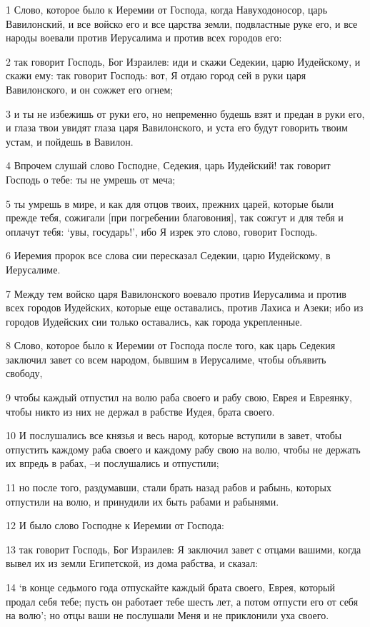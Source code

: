 \par 1 Слово, которое было к Иеремии от Господа, когда Навуходоносор, царь Вавилонский, и все войско его и все царства земли, подвластные руке его, и все народы воевали против Иерусалима и против всех городов его:
\par 2 так говорит Господь, Бог Израилев: иди и скажи Седекии, царю Иудейскому, и скажи ему: так говорит Господь: вот, Я отдаю город сей в руки царя Вавилонского, и он сожжет его огнем;
\par 3 и ты не избежишь от руки его, но непременно будешь взят и предан в руки его, и глаза твои увидят глаза царя Вавилонского, и уста его будут говорить твоим устам, и пойдешь в Вавилон.
\par 4 Впрочем слушай слово Господне, Седекия, царь Иудейский! так говорит Господь о тебе: ты не умрешь от меча;
\par 5 ты умрешь в мире, и как для отцов твоих, прежних царей, которые были прежде тебя, сожигали [при погребении благовония], так сожгут и для тебя и оплачут тебя: `увы, государь!', ибо Я изрек это слово, говорит Господь.
\par 6 Иеремия пророк все слова сии пересказал Седекии, царю Иудейскому, в Иерусалиме.
\par 7 Между тем войско царя Вавилонского воевало против Иерусалима и против всех городов Иудейских, которые еще оставались, против Лахиса и Азеки; ибо из городов Иудейских сии только оставались, как города укрепленные.
\par 8 Слово, которое было к Иеремии от Господа после того, как царь Седекия заключил завет со всем народом, бывшим в Иерусалиме, чтобы объявить свободу,
\par 9 чтобы каждый отпустил на волю раба своего и рабу свою, Еврея и Евреянку, чтобы никто из них не держал в рабстве Иудея, брата своего.
\par 10 И послушались все князья и весь народ, которые вступили в завет, чтобы отпустить каждому раба своего и каждому рабу свою на волю, чтобы не держать их впредь в рабах, --и послушались и отпустили;
\par 11 но после того, раздумавши, стали брать назад рабов и рабынь, которых отпустили на волю, и принудили их быть рабами и рабынями.
\par 12 И было слово Господне к Иеремии от Господа:
\par 13 так говорит Господь, Бог Израилев: Я заключил завет с отцами вашими, когда вывел их из земли Египетской, из дома рабства, и сказал:
\par 14 `в конце седьмого года отпускайте каждый брата своего, Еврея, который продал себя тебе; пусть он работает тебе шесть лет, а потом отпусти его от себя на волю'; но отцы ваши не послушали Меня и не приклонили уха своего.
